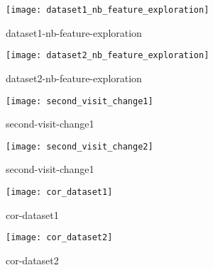 \begin{figure}[htpb]
    \centering
    \texttt{[image: dataset1\_nb\_feature\_exploration]}
    \caption{dataset1-nb-feature-exploration}
    \label{fig:dataset1-nb-feature-exploration}
\end{figure}

\begin{figure}[htpb]
    \centering
    \texttt{[image: dataset2\_nb\_feature\_exploration]}
    \caption{dataset2-nb-feature-exploration}
    \label{fig:dataset2-nb-feature-exploration}
\end{figure}

\begin{figure}[htpb]
    \centering
    \texttt{[image: second\_visit\_change1]}
    \caption{second-visit-change1}
    \label{fig:second-visit-change1}
\end{figure}

\begin{figure}[htpb]
    \centering
    \texttt{[image: second\_visit\_change2]}
    \caption{second-visit-change1}
    \label{fig:second-visit-change1}
\end{figure}

\begin{figure}[htpb]
    \centering
    \texttt{[image: cor\_dataset1]}
    \caption{cor-dataset1}
    \label{fig:cor-dataset1}
\end{figure}

\begin{figure}[htpb]
    \centering
    \texttt{[image: cor\_dataset2]}
    \caption{cor-dataset2}
    \label{fig:cor-dataset2}
\end{figure}



